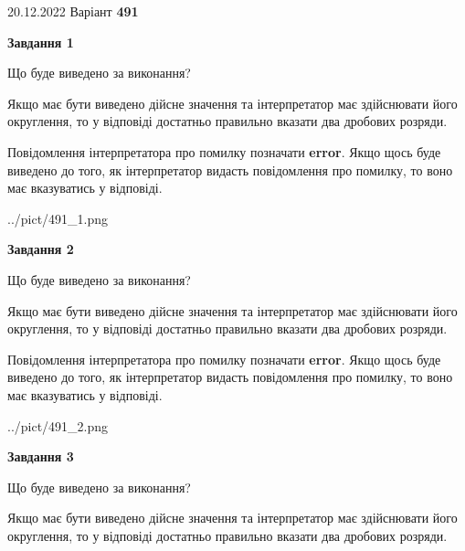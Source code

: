 \documentclass[12pt, ukrainian]{article}
\begin{document}
{20.12.2022 Варіант \No \textbf { 491 }\par}
{
\begin {Large}

{\begin {center}\textbf{Завдання 1}\end {center}}\par
Що буде виведено за виконання? \par

Якщо має бути виведено дійсне значення та інтерпретатор має здійснювати його округлення, 
то у відповіді достатньо правильно вказати два дробових розряди.

Повідомлення інтерпретатора про помилку позначати \textbf{error}.
Якщо щось буде виведено до того, як інтерпретатор видасть повідомлення про помилку, 
то воно має вказуватись у відповіді. \par

\begin{center}
	{../pict/491_1.png}
\end{center}
\newpage

{\begin {center}\textbf{Завдання 2}\end {center}}\par
Що буде виведено за виконання? \par

Якщо має бути виведено дійсне значення та інтерпретатор має здійснювати його округлення, 
то у відповіді достатньо правильно вказати два дробових розряди.

Повідомлення інтерпретатора про помилку позначати \textbf{error}.
Якщо щось буде виведено до того, як інтерпретатор видасть повідомлення про помилку, 
то воно має вказуватись у відповіді. \par

\begin{center}
	{../pict/491_2.png}
\end{center}
\newpage

{\begin {center}\textbf{Завдання 3}\end {center}}\par
Що буде виведено за виконання? \par

Якщо має бути виведено дійсне значення та інтерпретатор має здійснювати його округлення, 
то у відповіді достатньо правильно вказати два дробових розряди.


\end{Large}}
\end{document}
